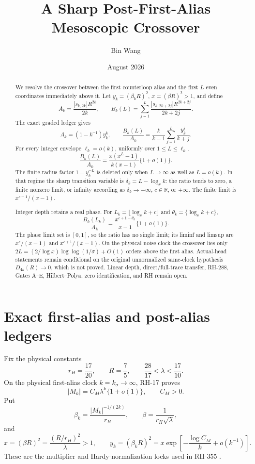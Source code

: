 \documentclass[11pt]{article}
\title{A Sharp Post-First-Alias\\Mesoscopic Crossover}
\author{Bin Wang}
\date{August 2026}
\theoremstyle{remark}
\begin{document}
\maketitle

\begin{abstract}
We resolve the crossover between the first counterloop alias and the first
$L$ even coordinates immediately above it.  Let
$y_k=(\beta_kR)^2$, $x=(\beta R)^2>1$, and define
\[
 A_k=\frac{|s_{k,2k}|R^{2k}}{2k},\qquad
 B_k(L)=\sum_{j=1}^L
 \frac{|s_{k,2k+2j}|R^{2k+2j}}{2k+2j}.
\]
The exact graded ledger gives
\[
 A_k=(1-k^{-1})y_k^k,\qquad
 \frac{B_k(L)}{A_k}
 =\frac{k}{k-1}\sum_{j=1}^L\frac{y_k^j}{k+j}.
\]
For every integer envelope $\ell_k=o(k)$, uniformly over
$1\le L\le\ell_k$,
\[
 \frac{B_k(L)}{A_k}
 =\frac{x(x^L-1)}{k(x-1)}\{1+o(1)\}.
\]
The finite-radius factor $1-y_k^{-L}$ is deleted only when $L\to\infty$ as well as
$L=o(k)$.  In that regime the sharp transition variable is
$\delta_k=L-\log_xk$: the ratio tends to zero, a finite nonzero limit, or
infinity according as $\delta_k\to-\infty$, $c\in\mathbb R$, or
$+\infty$.  The finite limit is $x^{c+1}/(x-1)$.

Integer depth retains a real phase.  For
$L_k=\lfloor\log_xk+c\rfloor$ and
$\theta_k=\{\log_xk+c\}$,
\[
 \frac{B_k(L_k)}{A_k}
 =\frac{x^{c+1-\theta_k}}{x-1}\{1+o(1)\}.
\]
The phase limit set is $[0,1]$, so the ratio has no single limit; its
liminf and limsup are $x^c/(x-1)$ and $x^{c+1}/(x-1)$.  On the physical
noise clock the crossover lies only
$2L=(2/\log x)\log\log(1/\sigma)+O(1)$ orders above the first alias.
Actual-head statements remain conditional on the original unnormalized
same-clock hypothesis $D_{4k}(R)\to0$, which is not proved.  Linear depth,
direct/full-trace transfer, RH-288, Gates A--E, Hilbert--Polya, zero
identification, and RH remain open.
\end{abstract}

\section{Exact first-alias and post-alias ledgers}

Fix the physical constants
\begin{equation}\label{eq:constants}
 r_H=\frac{17}{20},\qquad R=\frac75,
 \qquad \frac{28}{17}<\lambda<\frac{17}{10}.
\end{equation}
On the physical first-alias clock $k=k_\sigma\to\infty$, RH-17 proves
\begin{equation}\label{eq:multiplier}
 |M_k|=C_M\lambda^k\{1+o(1)\},\qquad C_M>0.
\end{equation}
Put
\begin{equation}\label{eq:beta}
 \beta_k=\frac{|M_k|^{-1/(2k)}}{r_H},\qquad
 \beta=\frac1{r_H\sqrt\lambda},
\end{equation}
and
\begin{equation}\label{eq:x-y}
 x=(\beta R)^2=\frac{(R/r_H)^2}{\lambda}>1,
 \qquad
 y_k=(\beta_kR)^2
 =x\exp\left[-\frac{\log C_M}{k}+o(k^{-1})\right].
\end{equation}
These are the multiplier and Hardy-normalization locks used in RH-355
\citep{WangTimeOrdered2026,WangProjectorMass2026,WangUpperBurden2026}.
\end{document}
